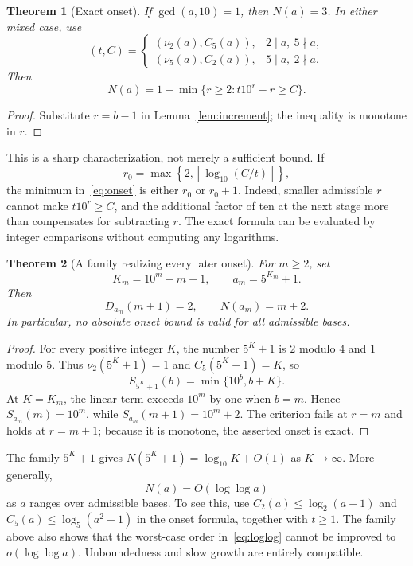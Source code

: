 \documentclass[11pt,a4paper]{article}
\newtheorem{theorem}{Theorem}[section]
\theoremstyle{definition}
\begin{document}
\begin{theorem}[Exact onset]\label{thm:onset}
If $\gcd(a,10)=1$, then $N(a)=3$. In either mixed case, use
\[
(t,C)=
\begin{cases}
(\nu_2(a),C_5(a)),&2\mid a,\ 5\nmid a,\\
(\nu_5(a),C_2(a)),&5\mid a,\ 2\nmid a.
\end{cases}
\]
Then
\begin{equation}\label{eq:onset}
N(a)=1+\min\{r\ge2:t10^r-r\ge C\}.
\end{equation}
\end{theorem}
\begin{proof}
Substitute $r=b-1$ in Lemma~\ref{lem:increment}; the inequality is
monotone in $r$.
\end{proof}

This is a sharp characterization, not merely a sufficient bound. If
\[
r_0=\max\left\{2,\left\lceil\log_{10}(C/t)\right\rceil\right\},
\]
the minimum in~\eqref{eq:onset} is either $r_0$ or $r_0+1$.
Indeed, smaller admissible $r$ cannot make $t10^r\ge C$, and the additional
factor of ten at the next stage more than compensates for subtracting $r$.
The exact formula can be evaluated by integer comparisons without computing
any logarithms.

\begin{theorem}[A family realizing every later onset]\label{thm:delay}
For $m\ge2$, set
\begin{equation}\label{eq:delay-family}
K_m=10^m-m+1,\qquad a_m=5^{K_m}+1.
\end{equation}
Then
\[
D_{a_m}(m+1)=2,\qquad N(a_m)=m+2.
\]
In particular, no absolute onset bound is valid for all admissible bases.
\end{theorem}
\begin{proof}
For every positive integer $K$, the number $5^K+1$ is $2$ modulo $4$ and
$1$ modulo $5$. Thus $\nu_2(5^K+1)=1$ and $C_5(5^K+1)=K$, so
\[
S_{5^K+1}(b)=\min\{10^b,b+K\}.
\]
At $K=K_m$, the linear term exceeds $10^m$ by one when $b=m$.
Hence $S_{a_m}(m)=10^m$, while $S_{a_m}(m+1)=10^m+2$.
The criterion fails at $r=m$ and holds at $r=m+1$; because it is monotone,
the asserted onset is exact.
\end{proof}

The family $5^K+1$ gives $N(5^K+1)=\log_{10}K+O(1)$ as $K\to\infty$.
More generally,
\begin{equation}\label{eq:loglog}
N(a)=O(\log\log a)
\end{equation}
as $a$ ranges over admissible bases. To see this, use
$C_2(a)\le\log_2(a+1)$ and $C_5(a)\le\log_5(a^2+1)$ in the onset
formula, together with $t\ge1$. The family above also shows that the
worst-case order in~\eqref{eq:loglog} cannot be improved to $o(\log\log a)$.
Unboundedness and slow growth are entirely compatible.
\end{document}
